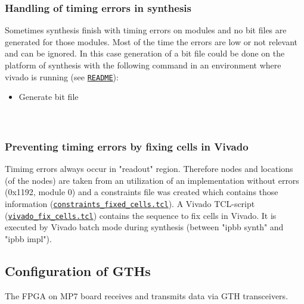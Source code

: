 \subsubsection{Handling of timing errors in synthesis}\label{sec:app:synth_timing_errors}

Sometimes synthesis finish with timing errors on modules and no bit files are generated for those modules.
Most of the time the errors are low or not relevant and can be ignored. In this case generation
of a bit file could be done on the platform of synthesis with the following command in an environment where
vivado is running (see \href{\gitbranch/README.md}{\texttt{README}}):\\
\begin{itemize}
\item Generate bit file\\
\\
\\
\end{itemize}

\subsubsection{Preventing timing errors by fixing cells in Vivado}\label{sec:app:prevent_timing_errors}

Timimg errors always occur in "readout" region. Therefore nodes and locations (of the nodes) are taken from an utilization of an implementation without errors (0x1192, module 0) and a constraints file was created which contains those information (\href{\gitbranch/firmware/ucf/constraints\_fixed\_cells.tcl}{\texttt{\textquotesingle constraints\_fixed\_cells.tcl\textquotesingle }}).
A Vivado TCL-script (\href{\gitbranch/scripts/vivado\_fix\_cells.tcl}{\texttt{\textquotesingle vivado\_fix\_cells.tcl\textquotesingle }}) contains the sequence to fix cells in Vivado. It is executed by Vivado batch mode during synthesis (between "ipbb synth" and "ipbb impl").

\clearpage

\subsection{Configuration of GTHs}\label{sec:app:app_a}

The FPGA on MP7 board receives and transmits data via GTH transceivers.\\

